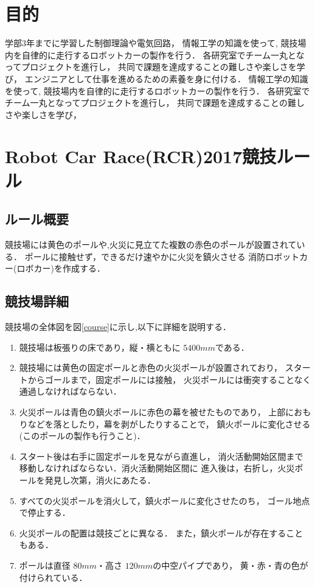 \documentclass[10pt,a4j]{jarticle}
\begin{document}


\newpage
\section{目的}
学部3年までに学習した制御理論や電気回路，
情報工学の知識を使って, 競技場内を自律的に走行するロボットカーの製作を行う．
各研究室でチーム一丸となってプロジェクトを進行し，
共同で課題を達成することの難しさや楽しさを学び，
エンジニアとして仕事を進めるための素養を身に付ける．
情報工学の知識を使って, 競技場内を自律的に走行するロボットカーの製作を行う．
各研究室でチーム一丸となってプロジェクトを進行し，
共同で課題を達成することの難しさや楽しさを学び，


\section{Robot Car Race(RCR)2017競技ルール}
\subsection{ルール概要}
競技場には黄色のポールや,火災に見立てた複数の赤色のポールが設置されている．
ポールに接触せず，できるだけ速やかに火災を鎮火させる
消防ロボットカー(ロボカー)を作成する．

\subsection{競技場詳細}
競技場の全体図を図\ref{course}に示し,以下に詳細を説明する．
\begin{enumerate}
  \item 競技場は板張りの床であり，縦・横ともに $5400\unit{mm}$である．

  \item 競技場には黄色の固定ポールと赤色の火災ポールが設置されており，
        スタートからゴールまで，固定ポールには接触，
        火災ポールには衝突することなく通過しなければならない．

  \item 火災ポールは青色の鎮火ポールに赤色の幕を被せたものであり，
        上部におもりなどを落としたり，幕を剥がしたりすることで，
        鎮火ポールに変化させる(このポールの製作も行うこと)．

  \item スタート後は右手に固定ポールを見ながら直進し，
        消火活動開始区間まで移動しなければならない．消火活動開始区間に
        進入後は，右折し，火災ポールを発見し次第，消火にあたる．

  \item すべての火災ポールを消火して，鎮火ポールに変化させたのち，
        ゴール地点で停止する．

  \item 火災ポールの配置は競技ごとに異なる．
        また，鎮火ポールが存在することもある．

  \item ポールは直径 $80\unit{mm}$・高さ $120\unit{mm}$の中空パイプであり，
        黄・赤・青の色が付けられている．
\end{enumerate}
\end{document}
